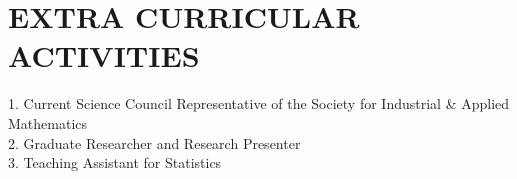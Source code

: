 \documentclass[paper=a4,fontsize=10pt]{scrartcl} %
\newlength{\spacebox}
\newcommand{\sepspace}{\vspace*{1em}}		%
\newcommand{\NewPart}[1]{\section*{\uppercase{#1}}}
\newcommand{\PersonalEntry}[2]{
		\noindent\hangindent=2em\hangafter=0 %
		\parbox{\spacebox}{        %
		\textit{#1}}		       %
		\hspace{1.5em} #2 \par}    %
\newcommand{\SkillsEntry}[2]{      %
		\noindent\hangindent=2em\hangafter=0 %
		\parbox{\spacebox}{        %
		\textit{#1}}			   %
		\hspace{1.5em} #2 \par}    %
\begin{document}
\sepspace







\NewPart{Extra Curricular Activities}{}
1. Current Science Council Representative of the Society for Industrial \& Applied Mathematics\\
2. Graduate Researcher and Research Presenter\\
3. Teaching Assistant for Statistics\\
\end{document}
